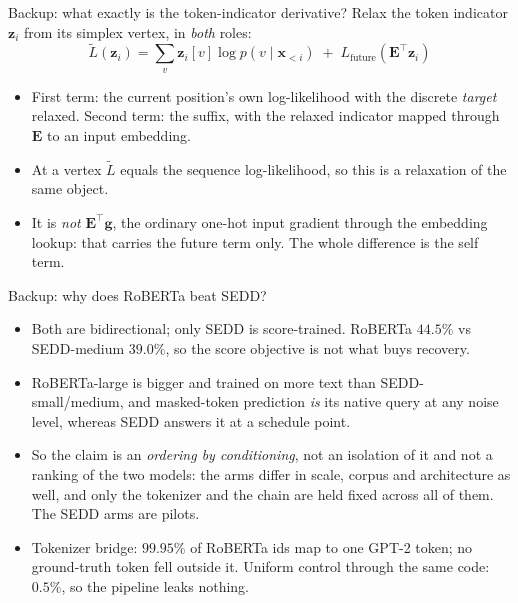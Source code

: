 \documentclass{beamer}
\begin{document}
\begin{frame}[noframenumbering]{Backup: what exactly is the token-indicator derivative?}
  \small
  Relax the token indicator $\bm{z}_i$ from its simplex vertex, in \emph{both} roles:
  \[ \tilde{L}(\bm{z}_i) = \sum_v \bm{z}_i[v]\log p(v\mid \bm{x}_{<i}) \;+\; L_{\text{future}}(\bm{E}^\top \bm{z}_i) \]
  \begin{itemize}
    \item First term: the current position's own log-likelihood with the discrete \emph{target} relaxed. Second term: the suffix, with the relaxed indicator mapped through $\bm{E}$ to an input embedding.
    \item At a vertex $\tilde{L}$ equals the sequence log-likelihood, so this is a relaxation of the same object.
    \item It is \emph{not} $\bm{E}^\top\bm{g}$, the ordinary one-hot input gradient through the embedding lookup: that carries the future term only. The whole difference is the self term.
  \end{itemize}
\end{frame}

\begin{frame}[noframenumbering]{Backup: why does RoBERTa beat SEDD?}
  \small
  \begin{itemize}
    \item Both are bidirectional; only SEDD is score-trained. RoBERTa $44.5\%$ vs SEDD-medium $39.0\%$, so the score objective is not what buys recovery.
    \item RoBERTa-large is bigger and trained on more text than SEDD-small/medium, and masked-token prediction \emph{is} its native query at any noise level, whereas SEDD answers it at a schedule point.
    \item So the claim is an \emph{ordering by conditioning}, not an isolation of it and not a ranking of the two models: the arms differ in scale, corpus and architecture as well, and only the tokenizer and the chain are held fixed across all of them. The SEDD arms are pilots.
    \item Tokenizer bridge: $99.95\%$ of RoBERTa ids map to one GPT-2 token; no ground-truth token fell outside it. Uniform control through the same code: $0.5\%$, so the pipeline leaks nothing.
  \end{itemize}
\end{frame}
\end{document}
